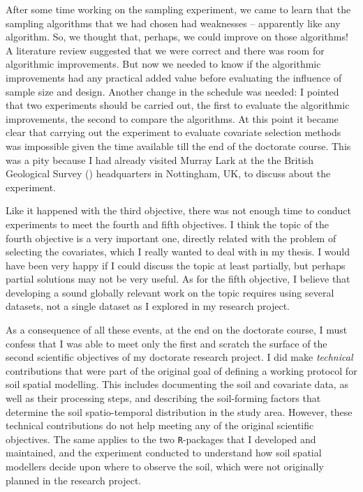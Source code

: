 After some time working on the sampling experiment, we came to learn that the sampling algorithms that we had 
chosen had weaknesses -- apparently like any algorithm. So, we thought that, perhaps, we could improve on 
those algorithms! A literature review suggested that we were correct and there was room for algorithmic 
improvements. But now we needed to know if the algorithmic improvements had any practical added value before 
evaluating the influence of sample size and design. Another change in the schedule was needed: I pointed that 
two experiments should be carried out, the first to evaluate the algorithmic improvements, the second to 
compare the algorithms. At this point it became clear that carrying out the experiment to evaluate covariate 
selection methods was impossible given the time available till the end of the doctorate course. This was a pity 
because I had already visited Murray Lark at the the British Geological Survey (\bgs) headquarters in 
Nottingham, UK, to discuss about the experiment.

Like it happened with the third objective, there was not enough time to conduct experiments to meet the fourth 
and fifth objectives. I think the topic of the fourth objective is a very important one, directly related 
with the problem of selecting the covariates, which I really wanted to deal with in my thesis. I would have 
been very happy if I could discuss the topic at least partially, but perhaps partial solutions may not be very 
useful. As for the fifth objective, I believe that developing a sound globally relevant work on the topic 
requires using several datasets, not a single dataset as I explored in my research project.

As a consequence of all these events, at the end on the doctorate course, I must confess that I was able 
to meet only the first and scratch the surface of the second scientific objectives of my doctorate research 
project. I did make \emph{technical} contributions that were part of the original goal of defining a working 
protocol for soil spatial modelling. This includes documenting the soil and covariate data, as well as their 
processing steps, and describing the soil-forming factors that determine the soil spatio-temporal distribution 
in the study area. However, these technical contributions do not help meeting any of the original scientific 
objectives. The same applies to the two \texttt{R}-packages that I developed and maintained, and the experiment 
conducted to understand how soil spatial modellers decide upon where to observe the soil, which were not 
originally planned in the research project.

